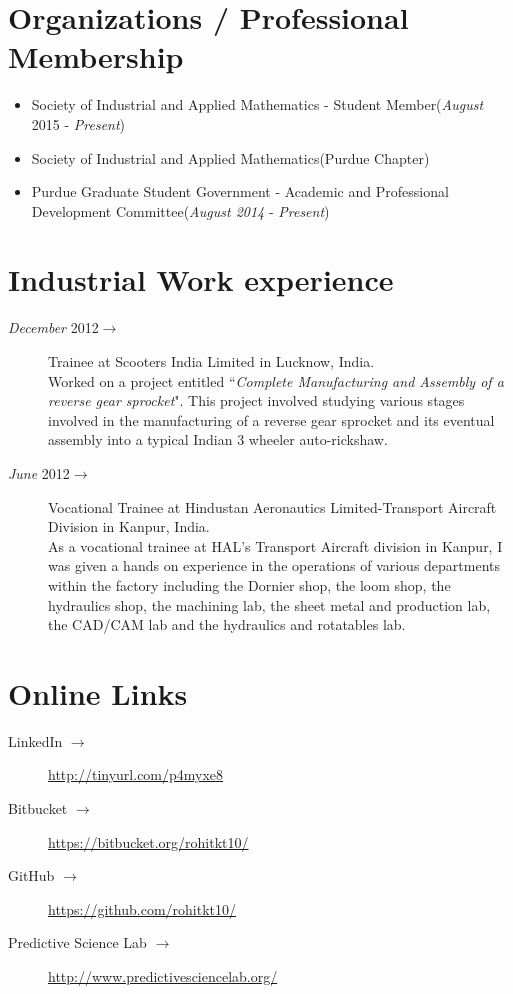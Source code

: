 \documentclass[margin,line,a4paper]{resume}
\begin{document}
\begin{resume}
\section{\mysidestyle Organizations / Professional Membership}
\begin{itemize}
\item Society of Industrial and Applied Mathematics - Student Member(\textit{August} 2015 - \textit{Present})
\item Society of Industrial and Applied Mathematics(Purdue Chapter) 
\item Purdue Graduate Student Government - Academic and Professional Development Committee(\textit{August 2014} - \textit{Present})
\end{itemize}



\section{\mysidestyle Industrial Work experience}\vspace{1mm}
\begin{description}
   
    \item[\textit{December} 2012$\rightarrow$ ] Trainee at Scooters India Limited in Lucknow, India. \\
    Worked on a project entitled ``\textit{Complete Manufacturing and Assembly of a reverse gear sprocket}". This project involved studying various stages involved in the manufacturing of a reverse gear sprocket and its eventual assembly into a typical Indian 3 wheeler auto-rickshaw.    
    
    \item[\textit{June} 2012$\rightarrow$ ] Vocational Trainee at Hindustan Aeronautics Limited-Transport Aircraft Division in Kanpur, India. \\
    As a vocational trainee at HAL's Transport Aircraft division in Kanpur, I was given a hands on experience in the operations of various departments within the factory including the Dornier shop, the loom shop, the hydraulics shop, the machining lab, the sheet metal and production lab, the CAD/CAM lab and the hydraulics and rotatables lab.
    \end{description}



\section{\mysidestyle Online Links}
\begin{description} 
\item[LinkedIn $\rightarrow$]  \url{http://tinyurl.com/p4myxe8}
\item[Bitbucket $\rightarrow$] \url{https://bitbucket.org/rohitkt10/}
\item[GitHub $\rightarrow$] \url{https://github.com/rohitkt10/}
\item[Predictive Science Lab $\rightarrow$] \url{http://www.predictivesciencelab.org/} 
\end{description} 
\end{resume}
\end{document}
